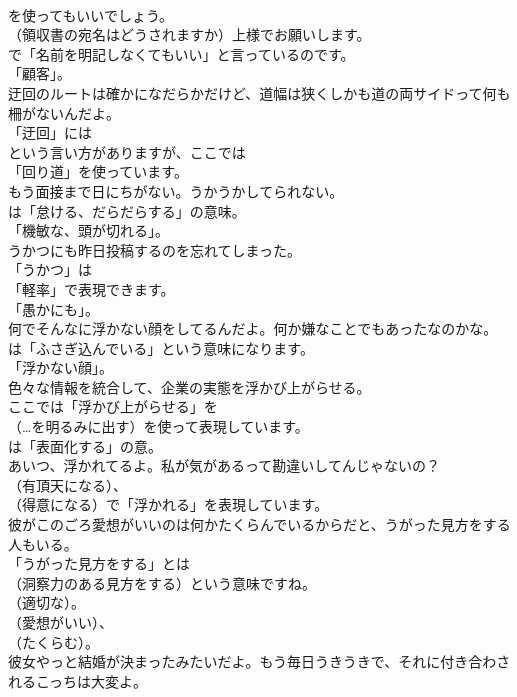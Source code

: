 \documentclass[8pt]{extreport}
\begin{document}
\begin{CJK}{UTF8}{min}
\\	を使ってもいいでしょう。	
\\	（領収書の宛名はどうされますか）上様でお願いします。 
\\	で「名前を明記しなくてもいい」と言っているのです。
\\	「顧客」。	
\\	迂回のルートは確かになだらかだけど、道幅は狭くしかも道の両サイドって何も柵がないんだよ。 
\\	「迂回」には
\\	という言い方がありますが、ここでは
\\	「回り道」を使っています。	
\\	もう面接まで日にちがない。うかうかしてられない。 
\\	は「怠ける、だらだらする」の意味。
\\	「機敏な、頭が切れる」。	
\\	うかつにも昨日投稿するのを忘れてしまった。 
\\	「うかつ」は
\\	「軽率」で表現できます。
\\	「愚かにも」。	
\\	何でそんなに浮かない顔をしてるんだよ。何か嫌なことでもあったなのかな。 
\\	は「ふさぎ込んでいる」という意味になります。
\\	「浮かない顔」。	
\\	色々な情報を統合して、企業の実態を浮かび上がらせる。 
\\	ここでは「浮かび上がらせる」を
\\	（…を明るみに出す）を使って表現しています。
\\	は「表面化する」の意。	
\\	あいつ、浮かれてるよ。私が気があるって勘違いしてんじゃないの？ 
\\	（有頂天になる）、
\\	（得意になる）で「浮かれる」を表現しています。	
\\	彼がこのごろ愛想がいいのは何かたくらんでいるからだと、うがった見方をする人もいる。 
\\	「うがった見方をする」とは
\\	（洞察力のある見方をする）という意味ですね。
\\	（適切な）。
\\	（愛想がいい）、
\\	（たくらむ）。	
\\	彼女やっと結婚が決まったみたいだよ。もう毎日うきうきで、それに付き合わされるこっちは大変よ。 

\end{CJK}
\end{document}
